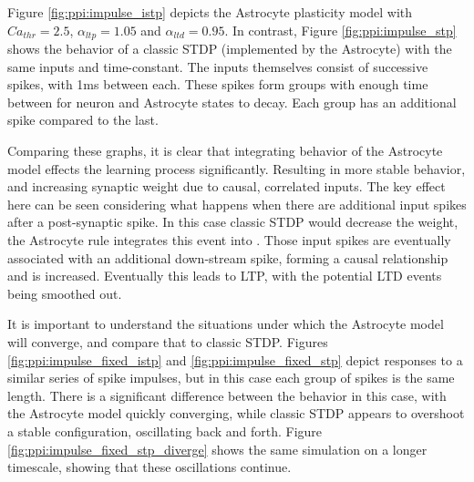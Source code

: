 Figure \ref{fig:ppi:impulse_istp} depicts the Astrocyte plasticity model with
$Ca_{thr}=2.5$, $\alpha_{ltp}=1.05$ and $\alpha_{ltd}=0.95$. In contrast, Figure
\ref{fig:ppi:impulse_stp} shows the behavior of a classic STDP (implemented by
the Astrocyte) with the same inputs and time-constant. The inputs themselves
consist of successive spikes, with 1ms between each. These spikes form groups
with enough time between for neuron and Astrocyte states to decay. Each group
has an additional spike compared to the last.

Comparing these graphs, it is clear that integrating
behavior of the Astrocyte model effects the learning process
significantly. Resulting in more stable behavior, and increasing synaptic weight
due to causal, correlated inputs. The key effect here can be seen considering
what happens when there are additional input spikes after a post-synaptic
spike. In this case classic STDP would decrease the weight, the Astrocyte rule
integrates this event into \ca. Those input spikes are eventually associated
with an additional down-stream spike, forming a causal relationship and \ca is
increased. Eventually this leads to LTP, with the potential LTD events being
smoothed out.



It is important to understand the situations under which the Astrocyte model
will converge, and compare that to classic STDP. Figures
\ref{fig:ppi:impulse_fixed_istp} and \ref{fig:ppi:impulse_fixed_stp} depict
responses to a similar series of spike impulses, but in this case each group of
spikes is the same length. There is a significant difference between the
behavior in this case, with the Astrocyte model quickly converging, while
classic STDP appears to overshoot a stable configuration, oscillating back and
forth. Figure \ref{fig:ppi:impulse_fixed_stp_diverge} shows the same simulation
on a longer timescale, showing that these oscillations continue.


